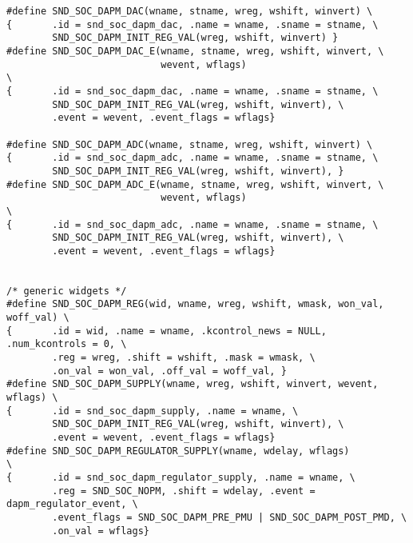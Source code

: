 \begin{frame}[fragile]{}
  \begin{block}{}
    \fontsize{8}{7}\selectfont
    \begin{verbatim}
#define SND_SOC_DAPM_DAC(wname, stname, wreg, wshift, winvert) \
{       .id = snd_soc_dapm_dac, .name = wname, .sname = stname, \
        SND_SOC_DAPM_INIT_REG_VAL(wreg, wshift, winvert) }
#define SND_SOC_DAPM_DAC_E(wname, stname, wreg, wshift, winvert, \
                           wevent, wflags)                                \
{       .id = snd_soc_dapm_dac, .name = wname, .sname = stname, \
        SND_SOC_DAPM_INIT_REG_VAL(wreg, wshift, winvert), \
        .event = wevent, .event_flags = wflags}

#define SND_SOC_DAPM_ADC(wname, stname, wreg, wshift, winvert) \
{       .id = snd_soc_dapm_adc, .name = wname, .sname = stname, \
        SND_SOC_DAPM_INIT_REG_VAL(wreg, wshift, winvert), }
#define SND_SOC_DAPM_ADC_E(wname, stname, wreg, wshift, winvert, \
                           wevent, wflags)                                \
{       .id = snd_soc_dapm_adc, .name = wname, .sname = stname, \
        SND_SOC_DAPM_INIT_REG_VAL(wreg, wshift, winvert), \
        .event = wevent, .event_flags = wflags}


/* generic widgets */
#define SND_SOC_DAPM_REG(wid, wname, wreg, wshift, wmask, won_val, woff_val) \
{       .id = wid, .name = wname, .kcontrol_news = NULL, .num_kcontrols = 0, \
        .reg = wreg, .shift = wshift, .mask = wmask, \
        .on_val = won_val, .off_val = woff_val, }
#define SND_SOC_DAPM_SUPPLY(wname, wreg, wshift, winvert, wevent, wflags) \
{       .id = snd_soc_dapm_supply, .name = wname, \
        SND_SOC_DAPM_INIT_REG_VAL(wreg, wshift, winvert), \
        .event = wevent, .event_flags = wflags}
#define SND_SOC_DAPM_REGULATOR_SUPPLY(wname, wdelay, wflags)            \
{       .id = snd_soc_dapm_regulator_supply, .name = wname, \
        .reg = SND_SOC_NOPM, .shift = wdelay, .event = dapm_regulator_event, \
        .event_flags = SND_SOC_DAPM_PRE_PMU | SND_SOC_DAPM_POST_PMD, \
        .on_val = wflags}
    \end{verbatim}
  \end{block}
\end{frame}

